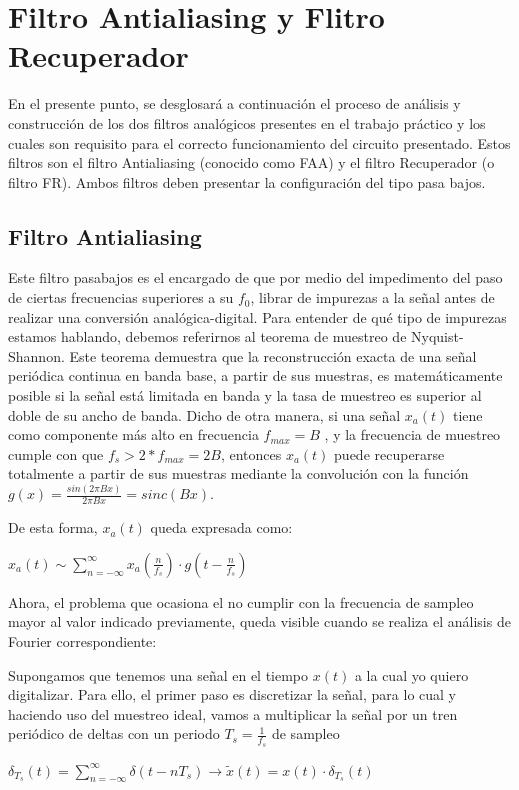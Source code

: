 \documentclass[../../ASSD_TP1_G7.tex]{subfiles}
\begin{document}
\chapter*{Filtro Antialiasing y Flitro Recuperador}
En el presente punto, se desglosará a continuación el proceso de análisis
y construcción de los dos filtros analógicos presentes en el trabajo
práctico y los cuales son requisito para el correcto funcionamiento
del circuito presentado. Estos filtros son el filtro Antialiasing
(conocido como FAA) y el filtro Recuperador (o filtro FR). Ambos filtros
deben presentar la configuración del tipo pasa bajos.


\section{Filtro Antialiasing}

Este filtro pasabajos es el encargado de que por medio del impedimento
del paso de ciertas frecuencias superiores a su $f_{0}$, librar de
impurezas a la señal antes de realizar una conversión analógica-digital.
Para entender de qué tipo de impurezas estamos hablando, debemos referirnos
al teorema de muestreo de Nyquist-Shannon. Este teorema demuestra
que la reconstrucción exacta de una señal periódica continua en banda
base, a partir de sus muestras, es matemáticamente posible si la señal
está limitada en banda y la tasa de muestreo es superior al doble
de su ancho de banda. Dicho de otra manera, si una señal $x_{a}(t)$
tiene como componente más alto en frecuencia $f_{max}=B$ , y la frecuencia
de muestreo cumple con que $f_{s}>2*f_{max}=2B$, entonces $x_{a}(t)$
puede recuperarse totalmente a partir de sus muestras mediante la
convolución con la función $g(x)=\frac{sin(2\pi Bx)}{2\pi Bx}=sinc(Bx)$.

De esta forma, $x_{a}(t)$ queda expresada como:
\begin{center}
\textit{\Large{}$x_{a}(t)\sim\sum_{n=-\infty}^{\infty}x_{a}(\frac{n}{f_{s}})\cdot g(t-\frac{n}{f_{s}})$}{\Large\par}
\par\end{center}

Ahora, el problema que ocasiona el no cumplir con la frecuencia de
sampleo mayor al valor indicado previamente, queda visible cuando
se realiza el análisis de Fourier correspondiente:

Supongamos que tenemos una señal en el tiempo $x(t)$ a la cual yo
quiero digitalizar. Para ello, el primer paso es discretizar la señal,
para lo cual y haciendo uso del muestreo ideal, vamos a multiplicar
la señal por un tren periódico de deltas con un periodo $T_{s}=\frac{1}{f_{s}}$
de sampleo
\begin{center}
\textit{\Large{}$\delta_{T_{s}}(t)=\sum_{n=-\infty}^{\infty}\delta(t-nT_{s})\rightarrow\tilde{x}(t)=x(t)\cdot\delta_{T_{s}}(t)$}{\Large\par}
\par\end{center}
\end{document}
